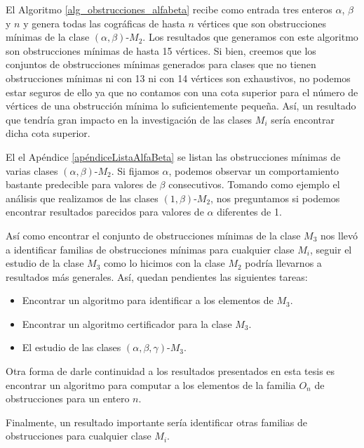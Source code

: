El Algoritmo \ref{alg_obstrucciones_alfabeta} recibe como entrada tres enteros $\alpha$, $\beta$ y $n$ y genera todas las cográficas de hasta $n$ vértices que son obstrucciones mínimas de la clase $(\alpha,\beta)$-$M_2$. Los resultados que generamos con este algoritmo son obstrucciones mínimas de hasta 15 vértices. Si bien, creemos que los conjuntos de obstrucciones mínimas generados para clases que no tienen obstrucciones mínimas ni con 13 ni con 14 vértices son exhaustivos, no podemos estar seguros de ello ya que no contamos con una cota superior para el número de vértices de una obstrucción mínima lo suficientemente pequeña. Así, un resultado que tendría gran impacto en la investigación de las clases $M_i$ sería encontrar dicha cota superior.

El el Apéndice \ref{apéndiceListaAlfaBeta} se listan las obstrucciones mínimas de varias clases $(\alpha,\beta)$-$M_2$. Si fijamos $\alpha$, podemos observar un comportamiento bastante predecible para valores de $\beta$ consecutivos. Tomando como ejemplo el análisis que realizamos de las clases $(1,\beta)$-$M_2$, nos preguntamos si podemos encontrar resultados parecidos para valores de $\alpha$ diferentes de 1.

Así como encontrar el conjunto de obstrucciones mínimas de la clase $M_3$ nos llevó a identificar familias de obstrucciones mínimas para cualquier clase $M_i$, seguir el estudio de la clase $M_3$ como lo hicimos con la clase $M_2$ podría llevarnos a resultados más generales. Así, quedan pendientes las siguientes tareas:
\begin{itemize}
    \item Encontrar un algoritmo para identificar a los elementos de $M_3$.
    \item Encontrar un algoritmo certificador para la clase $M_3$.
    \item El estudio de las clases $(\alpha,\beta,\gamma)$-$M_3$.
\end{itemize}

Otra forma de darle continuidad a los resultados presentados en esta tesis es encontrar un algoritmo para computar a los elementos de la familia $O_n$ de obstrucciones para un entero $n$.

Finalmente, un resultado importante sería identificar otras familias de obstrucciones para cualquier clase $M_i$.
